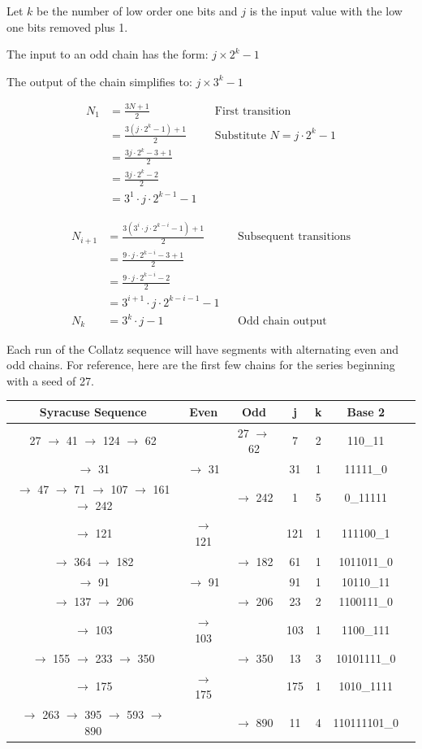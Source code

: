 \documentclass[letterpaper]{article}
\begin{document}
\begin{multicols}{2}
Let \( k \) be the number of low order one bits and \( j \) is the input value with the low one bits removed plus 1.

The input to an odd chain has the form: \( j \times 2^k - 1 \)

The output of the chain simplifies to: \( j \times 3^k - 1 \)

\begin{align*}
    N_1 &= \frac{3N + 1}{2} & &\text{First transition} \\
        &= \frac{3(j \cdot 2^k - 1) + 1}{2} & &\text{Substitute } N = j \cdot 2^k - 1 \\
        &= \frac{3j \cdot 2^k - 3 + 1}{2} \\
        &= \frac{3j \cdot 2^k - 2}{2} \\
        &= 3^1 \cdot j \cdot 2^{k-1} - 1
\end{align*}

\begin{align*}
    N_{i+1} &= \frac{3 \left(3^i \cdot j \cdot 2^{k-i} - 1\right) + 1}{2} & &\text{Subsequent transitions} \\
            &= \frac{9 \cdot j \cdot 2^{k-i} - 3 + 1}{2} \\
            &= \frac{9 \cdot j \cdot 2^{k-i} - 2}{2} \\
            &= 3^{i+1} \cdot j \cdot 2^{k-i-1} - 1 \\
    N_k     &= 3^k \cdot j - 1 & &\text{Odd chain output}
\end{align*}

Each run of the Collatz sequence will have segments with alternating even and odd chains. For reference, here are the first few chains for the series beginning with a seed of 27.

\begin{table}[ht]
\centering
\begin{tabular}{|c|c|c|c|c|c|c|}
\hline
\textbf{Syracuse Sequence} & \textbf{Even} & \textbf{Odd} & \textbf{j} & \textbf{k} & \textbf{Base 2} \\ 
\hline
27 $\to$ 41 $\to$ 124 $\to$ 62&&27 $\to$ 62&7&2&110\_11 \\ 
\hline
$\to$ 31&$\to$ 31&&31&1&11111\_0 \\ 
\hline
$\to$ 47 $\to$ 71 $\to$ 107 $\to$ 161 $\to$ 242&&$\to$ 242&1&5&0\_11111 \\ 
\hline
$\to$ 121&$\to$ 121&&121&1&111100\_1 \\ 
\hline
$\to$ 364 $\to$ 182&&$\to$ 182&61&1&1011011\_0 \\ 
\hline
$\to$ 91&$\to$ 91&&91&1&10110\_11 \\ 
\hline
$\to$ 137 $\to$ 206&&$\to$ 206&23&2&1100111\_0 \\ 
\hline
$\to$ 103&$\to$ 103&&103&1&1100\_111 \\ 
\hline
$\to$ 155 $\to$ 233 $\to$ 350&&$\to$ 350&13&3&10101111\_0 \\ 
\hline
$\to$ 175&$\to$ 175&&175&1&1010\_1111 \\ 
\hline
$\to$ 263 $\to$ 395 $\to$ 593 $\to$ 890&&$\to$ 890&11&4&110111101\_0 \\ 
\hline
\end{tabular}
\end{table}


\end{multicols}
\end{document}
